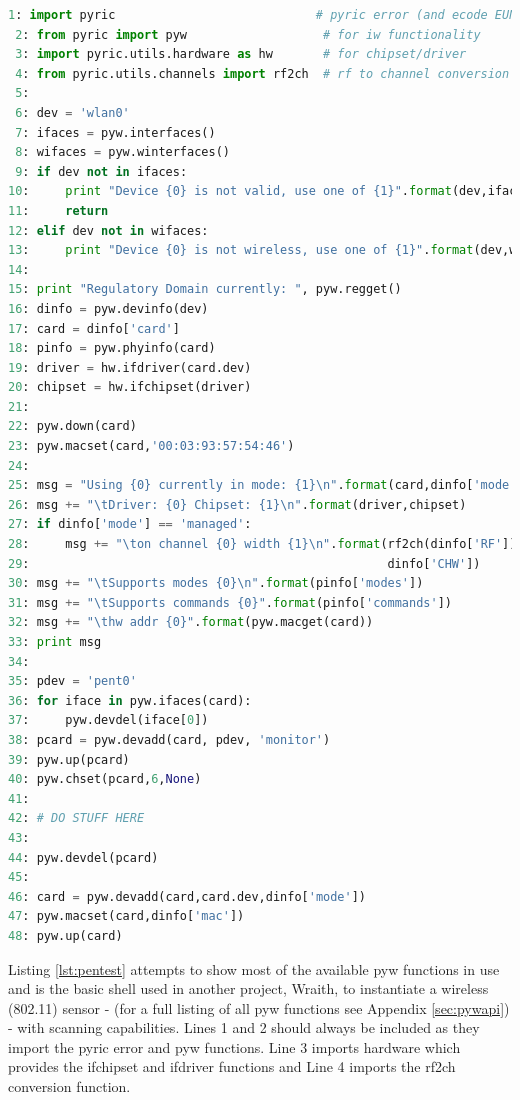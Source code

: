\documentclass[11pt]{article}
\begin{document}
\begin{lstlisting}[caption={Setting up a Wireless Pentest Environment},
                   label={lst:pentest},
                   language=Python]
 1: import pyric                            # pyric error (and ecode EUNDEF)
 2: from pyric import pyw                   # for iw functionality
 3: import pyric.utils.hardware as hw       # for chipset/driver
 4: from pyric.utils.channels import rf2ch  # rf to channel conversion
 5:
 6: dev = 'wlan0'
 7: ifaces = pyw.interfaces()
 8: wifaces = pyw.winterfaces()
 9: if dev not in ifaces:
10:     print "Device {0} is not valid, use one of {1}".format(dev,ifaces)
11:     return
12: elif dev not in wifaces:
13:     print "Device {0} is not wireless, use one of {1}".format(dev,wifaces)
14:
15: print "Regulatory Domain currently: ", pyw.regget()
16: dinfo = pyw.devinfo(dev)
17: card = dinfo['card']
18: pinfo = pyw.phyinfo(card)
19: driver = hw.ifdriver(card.dev)
20: chipset = hw.ifchipset(driver)
21:
22: pyw.down(card)
23: pyw.macset(card,'00:03:93:57:54:46')
24:
25: msg = "Using {0} currently in mode: {1}\n".format(card,dinfo['mode'])
26: msg += "\tDriver: {0} Chipset: {1}\n".format(driver,chipset)
27: if dinfo['mode'] == 'managed':
28:     msg += "\ton channel {0} width {1}\n".format(rf2ch(dinfo['RF']),
29:                                                  dinfo['CHW'])
30: msg += "\tSupports modes {0}\n".format(pinfo['modes'])
31: msg += "\tSupports commands {0}".format(pinfo['commands'])
32: msg += "\thw addr {0}".format(pyw.macget(card))
33: print msg
34:
35: pdev = 'pent0'
36: for iface in pyw.ifaces(card):
37:     pyw.devdel(iface[0])
38: pcard = pyw.devadd(card, pdev, 'monitor')
39: pyw.up(pcard)
40: pyw.chset(pcard,6,None)
41: 
42: # DO STUFF HERE 
43:
44: pyw.devdel(pcard)
45:
46: card = pyw.devadd(card,card.dev,dinfo['mode'])
47: pyw.macset(card,dinfo['mac'])
48: pyw.up(card)
\end{lstlisting}

Listing \ref{lst:pentest} attempts to show most of the available pyw functions 
in use and is the basic shell used in another project, Wraith\cite{wraith}, to 
instantiate a wireless (802.11) sensor - (for a full listing of all pyw functions
see Appendix \ref{sec:pywapi}) - with scanning capabilities. Lines 1 and 2 should 
always be included as they import the pyric error and pyw functions. Line 3 
imports hardware which provides the ifchipset and ifdriver functions and Line 4 
imports the rf2ch conversion function. \\
\end{document}
